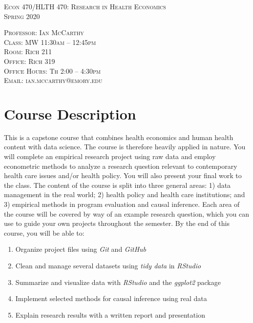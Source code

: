 \documentclass{article}
\begin{document}
\thispagestyle{empty}

\begin{center}
\textsc{\Large{Econ 470/HLTH 470: Research in Health Economics}} \\
\textsc{\large{Spring 2020}}
\end{center}

\noindent \textsc{Professor: Ian McCarthy} \\
\noindent \textsc{Class: MW 11:30am -- 12:45pm} \\
\noindent \textsc{Room: Rich 211}  \\
\noindent \textsc{Office: Rich 319} \\
\noindent \textsc{Office Hours: Th 2:00 -- 4:30pm} \\
\noindent \textsc{Email: ian.mccarthy@emory.edu} \\

\section*{Course Description}
This is a capstone course that combines health economics and human health content with data science. The course is therefore heavily applied in nature. You will complete an empirical research project using raw data and employ econometric methods to analyze a research question relevant to contemporary health care issues and/or health policy. You will also present your final work to the class. The content of the course is split into three general areas: 1) data management in the real world; 2) health policy and health care institutions; and 3) empirical methods in program evaluation and causal inference. Each area of the course will be covered by way of an example research question, which you can use to guide your own projects throughout the semester. By the end of this course, you will be able to:
\begin{enumerate}
 \item Organize project files using \textit{Git} and \textit{GitHub}
 \item Clean and manage several datasets using \textit{tidy data} in \textit{RStudio}
 \item Summarize and visualize data with \textit{RStudio} and the \textit{ggplot2} package
 \item Implement selected methods for causal inference using real data
 \item Explain research results with a written report and presentation
\end{enumerate}
\end{document}
